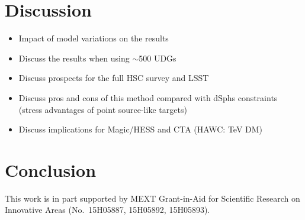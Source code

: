 \documentclass[a4paper,11pt]{article}
\begin{document}
\section{Discussion}
\begin{itemize}
    \item Impact of model variations on the results
    \item Discuss the results when using $\sim$500 UDGs
    \item Discuss prospects for the full HSC survey and LSST
    \item Discuss pros and cons of this method compared with dSphs constraints (stress advantages of point source-like targets)
    \item Discuss implications for Magic/HESS and CTA (HAWC: TeV DM) 
\end{itemize}

\section{Conclusion}

\acknowledgments
This work is in part supported by MEXT Grant-in-Aid for Scientific Research on Innovative Areas (No.~15H05887, 15H05892, 15H05893).



\end{document}

